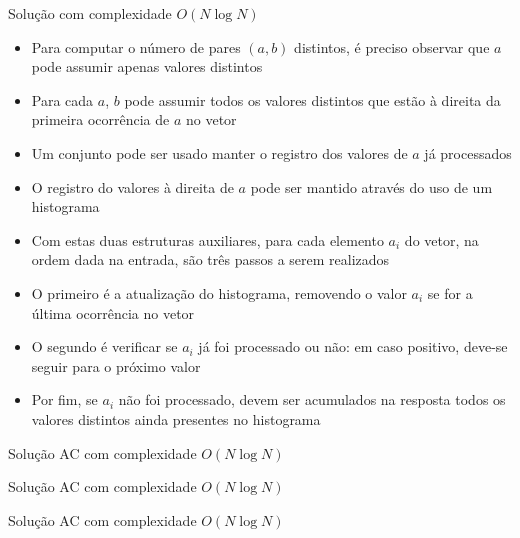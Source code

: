 \begin{frame}[fragile]{Solução com complexidade $O(N\log N)$}

    \begin{itemize}
        \item Para computar o número de pares $(a, b)$ distintos, é preciso observar que $a$
            pode assumir apenas valores distintos

        \item Para cada $a$, $b$ pode assumir todos os valores distintos que
            estão à direita da primeira ocorrência de $a$ no vetor

        \item Um conjunto pode ser usado manter o registro dos valores de $a$ já processados

        \item O registro do valores à direita de $a$ pode ser mantido através do uso de um
            histograma

        \item Com estas duas estruturas auxiliares, para cada elemento $a_i$ do vetor, na
            ordem dada na entrada, são três passos a serem realizados

        \item O primeiro é a atualização do histograma, removendo o valor $a_i$ se for a 
            última ocorrência no vetor

        \item O segundo é verificar se $a_i$ já foi processado ou não: em caso positivo, deve-se
            seguir para o próximo valor

        \item Por fim, se $a_i$ não foi processado, devem ser acumulados na resposta todos 
            os valores distintos ainda presentes no histograma
   \end{itemize}

\end{frame}

\begin{frame}[fragile]{Solução AC com complexidade $O(N\log N)$}
\end{frame}

\begin{frame}[fragile]{Solução AC com complexidade $O(N\log N)$}
\end{frame}

\begin{frame}[fragile]{Solução AC com complexidade $O(N\log N)$}
\end{frame}
